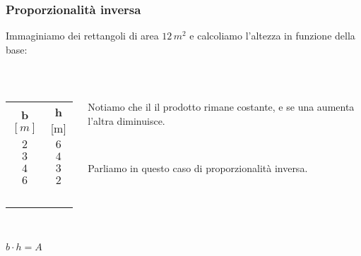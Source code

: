 \documentclass[]{beamer}
\begin{document}
\begin{frame}
\frametitle{Proporzionalità inversa}
Immaginiamo dei rettangoli di area $ 12 \, m^2 $ e calcoliamo l'altezza in funzione della base:

~

\begin{columns}
\begin{column}{0.4\textwidth}
\centering
\begin{tabular}{c|c}
\textbf{b} $ [m] $ & \textbf{h} [m] \\\rule{0pt}{4ex}
$ 2 $ & $ 6 $ \\\rule{0pt}{3ex}
$ 3 $ & $ 4 $ \\\rule{0pt}{3ex}
$ 4 $ & $ 3 $ \\\rule{0pt}{3ex}
$ 6 $ & $ 2 $ \\\
\end{tabular}

~

$ b \cdot h = A $
\end{column}
\begin{column}{0.4\textwidth}
\pause Notiamo che il \alert<2>{il prodotto rimane costante, e se una aumenta l'altra diminuisce}.\pause

~

Parliamo in questo caso di \alert<3>{proporzionalità inversa}.
\end{column}
\end{columns}
\end{frame}
\end{document}
